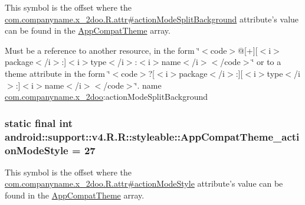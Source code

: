 This symbol is the offset where the \hyperlink{classcom_1_1companyname_1_1x__2doo_1_1_r_1_1attr_8aeadb6b575c0d3036eb01011133a4fc}{com.companyname.x\_\-2doo.R.attr\#actionModeSplitBackground} attribute's value can be found in the \hyperlink{classandroid_1_1support_1_1v4_1_1_r_1_1styleable_0873e92ba21076bb5a4aeadeb7f5779f}{AppCompatTheme} array.

Must be a reference to another resource, in the form \char`\"{}$<$code$>$@\mbox{[}+\mbox{]}\mbox{[}$<$i$>$package$<$/i$>$:\mbox{]}$<$i$>$type$<$/i$>$:$<$i$>$name$<$/i$>$$<$/code$>$\char`\"{} or to a theme attribute in the form \char`\"{}$<$code$>$?\mbox{[}$<$i$>$package$<$/i$>$:\mbox{]}\mbox{[}$<$i$>$type$<$/i$>$:\mbox{]}$<$i$>$name$<$/i$>$$<$/code$>$\char`\"{}.  name \hyperlink{namespacecom_1_1companyname_1_1x__2doo}{com.companyname.x\_\-2doo}:actionModeSplitBackground \hypertarget{classandroid_1_1support_1_1v4_1_1_r_1_1styleable_7b9d118860f9039d760ed5c14bc0d23c}{
\subsubsection[{AppCompatTheme\_\-actionModeStyle}]{\setlength{\rightskip}{0pt plus 5cm}static final int android::support::v4.R.R::styleable::AppCompatTheme\_\-actionModeStyle = 27}}
\label{classandroid_1_1support_1_1v4_1_1_r_1_1styleable_7b9d118860f9039d760ed5c14bc0d23c}


This symbol is the offset where the \hyperlink{classcom_1_1companyname_1_1x__2doo_1_1_r_1_1attr_becb542b358a8863281dc71b4a221f70}{com.companyname.x\_\-2doo.R.attr\#actionModeStyle} attribute's value can be found in the \hyperlink{classandroid_1_1support_1_1v4_1_1_r_1_1styleable_0873e92ba21076bb5a4aeadeb7f5779f}{AppCompatTheme} array.

